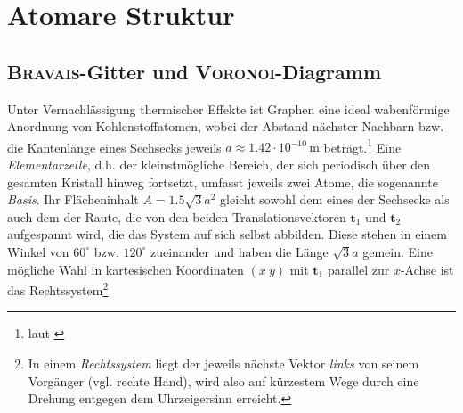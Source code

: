 \documentclass[a4paper, 10pt, twoside, openany]{book} %
\def \vec {\boldsymbol}
\begin{document}
\section{Atomare Struktur}
\label{Atomare Struktur}

\subsection{\textsc{Bravais}-Gitter und \textsc{Voronoi}-Diagramm}
\label{Bravais-Gitter}

Unter Vernachlässigung thermischer Effekte ist Graphen eine ideal wabenförmige Anordnung von Kohlenstoffatomen, wobei der Abstand nächster Nachbarn bzw. die Kantenlänge eines Sechsecks jeweils $a \approx 1.42 \cdot 10^{-10}\,\mathrm{m}$ beträgt.\footnote{laut \cite[S.~6]{Katsnelson1}} Eine \emph{Elementarzelle}, d.h. der kleinstmögliche Bereich, der sich periodisch über den gesamten Kristall hinweg fortsetzt, umfasst jeweils zwei Atome, die sogenannte \emph{Basis}. Ihr Flächeninhalt $A = 1.5 \sqrt{3} a^2$ gleicht sowohl dem eines der Sechsecke als auch dem der Raute, die von den beiden Translationsvektoren $\vec t_1$ und $\vec t_2$ aufgespannt wird, die das System auf sich selbst abbilden. Diese stehen in einem Winkel von $60^\circ$ bzw. $120^\circ$ zueinander und haben die Länge $\sqrt 3 a$ gemein. Eine mögliche Wahl in kartesischen Koordinaten $(x \ y)$ mit $\vec t_1$ parallel zur $x$-Achse ist das Rechtssystem\footnote{In einem \emph{Rechtssystem} liegt der jeweils nächste Vektor \emph{links} von seinem Vorgänger (vgl. rechte Hand), wird also auf kürzestem Wege durch eine Drehung entgegen dem Uhrzeigersinn erreicht.}
%
\end{document}

